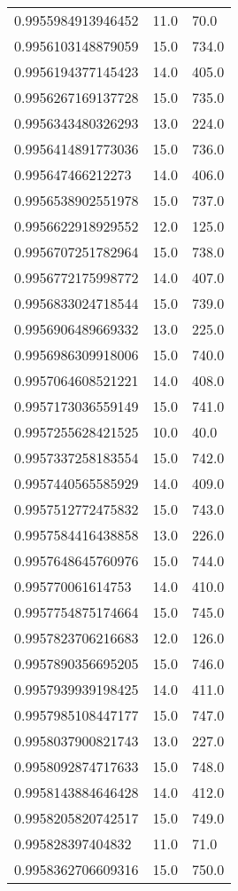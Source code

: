 \begin{center}
\begin{supertabular}[H]{p{0.30\textwidth}p{0.05\textwidth}p{0.05\textwidth}}
0.9955984913946452 & 11.0 & 70.0 \\ 
0.9956103148879059 & 15.0 & 734.0 \\ 
0.9956194377145423 & 14.0 & 405.0 \\ 
0.9956267169137728 & 15.0 & 735.0 \\ 
0.9956343480326293 & 13.0 & 224.0 \\ 
0.9956414891773036 & 15.0 & 736.0 \\ 
0.995647466212273 & 14.0 & 406.0 \\ 
0.9956538902551978 & 15.0 & 737.0 \\ 
0.9956622918929552 & 12.0 & 125.0 \\ 
0.9956707251782964 & 15.0 & 738.0 \\ 
0.9956772175998772 & 14.0 & 407.0 \\ 
0.9956833024718544 & 15.0 & 739.0 \\ 
0.9956906489669332 & 13.0 & 225.0 \\ 
0.9956986309918006 & 15.0 & 740.0 \\ 
0.9957064608521221 & 14.0 & 408.0 \\ 
0.9957173036559149 & 15.0 & 741.0 \\ 
0.9957255628421525 & 10.0 & 40.0 \\ 
0.9957337258183554 & 15.0 & 742.0 \\ 
0.9957440565585929 & 14.0 & 409.0 \\ 
0.9957512772475832 & 15.0 & 743.0 \\ 
0.9957584416438858 & 13.0 & 226.0 \\ 
0.9957648645760976 & 15.0 & 744.0 \\ 
0.995770061614753 & 14.0 & 410.0 \\ 
0.9957754875174664 & 15.0 & 745.0 \\ 
0.9957823706216683 & 12.0 & 126.0 \\ 
0.9957890356695205 & 15.0 & 746.0 \\ 
0.9957939939198425 & 14.0 & 411.0 \\ 
0.9957985108447177 & 15.0 & 747.0 \\ 
0.9958037900821743 & 13.0 & 227.0 \\ 
0.9958092874717633 & 15.0 & 748.0 \\ 
0.9958143884646428 & 14.0 & 412.0 \\ 
0.9958205820742517 & 15.0 & 749.0 \\ 
0.995828397404832 & 11.0 & 71.0 \\ 
0.9958362706609316 & 15.0 & 750.0 \\ 

\end{supertabular}
\end{center}
